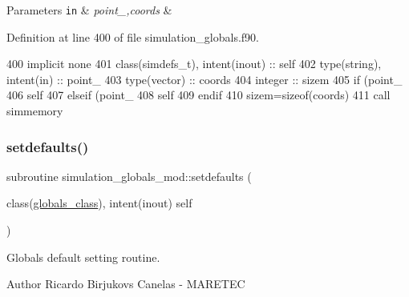 \begin{DoxyParams}[1]{Parameters}
\mbox{\tt in}  & {\em point\+\_\+,coords} & \\
\hline
\end{DoxyParams}


Definition at line 400 of file simulation\+\_\+globals.\+f90.


\begin{DoxyCode}
400     \textcolor{keywordtype}{implicit none}
401     \textcolor{keywordtype}{class}(simdefs\_t), \textcolor{keywordtype}{intent(inout)} :: self
402     \textcolor{keywordtype}{type}(string), \textcolor{keywordtype}{intent(in)} :: point\_
403     \textcolor{keywordtype}{type}(vector) :: coords
404     \textcolor{keywordtype}{integer} :: sizem
405     \textcolor{keywordflow}{if} (point\_%
406         self%
407     \textcolor{keywordflow}{elseif} (point\_%
408         self%
409 \textcolor{keywordflow}{    endif}
410     sizem=sizeof(coords)
411     \textcolor{keyword}{call }simmemory%
\end{DoxyCode}
\mbox{\label{namespacesimulation__globals__mod_ac2ac06271de377004c67b6ba2f3ed353}} 
\subsubsection{\texorpdfstring{setdefaults()}{setdefaults()}}
{\footnotesize\ttfamily subroutine simulation\+\_\+globals\+\_\+mod\+::setdefaults (\begin{DoxyParamCaption}\item[{class(\mbox{\hyperlink{structsimulation__globals__mod_1_1globals__class}{globals\+\_\+class}}), intent(inout)}]{self }\end{DoxyParamCaption})\hspace{0.3cm}{\ttfamily [private]}}



Globals default setting routine. 

\begin{DoxyAuthor}{Author}
Ricardo Birjukovs Canelas -\/ M\+A\+R\+E\+T\+EC 
\end{DoxyAuthor}



